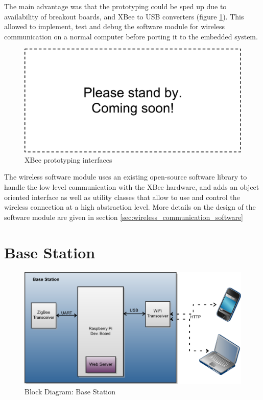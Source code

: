 The main advantage was that the prototyping could be sped up due to availability of breakout boards, and XBee to USB converters (figure \ref{fig:xbee_prototyping_interfaces}). This allowed to implement, test and debug the software module for wireless communication on a normal computer before porting it to the embedded system.

\begin{figure}
\includegraphics[width=\textwidth]{Images/dummy}
\caption{XBee prototyping interfaces}
\label{fig:xbee_prototyping_interfaces}
\end{figure}

The wireless software module uses an existing open-source software library to handle the low level communication with the XBee hardware, and adds an object oriented interface as well as utility classes that allow to use and control the wireless connection at a high abstraction level. More details on the design of the software module are given in section \ref{sec:wireless_communication_software}


\section{Base Station}
\begin{figure}[htb]
\includegraphics[width=\textwidth]{Images/BaseStationBlockDiagram}
\caption{Block Diagram: Base Station}
\label{fig:block_base_station}
\end{figure}

